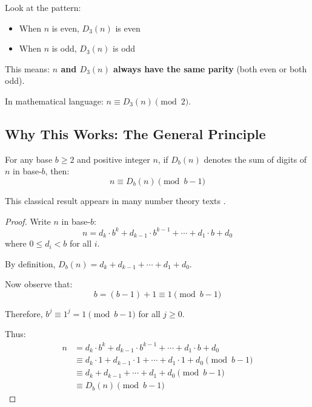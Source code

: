 \begin{intuitive}
Look at the pattern:
\begin{itemize}
\item When $n$ is even, $D_3(n)$ is even
\item When $n$ is odd, $D_3(n)$ is odd
\end{itemize}

This means: \textbf{$n$ and $D_3(n)$ always have the same parity} (both even or both odd).

In mathematical language: $n \equiv D_3(n) \pmod{2}$.
\end{intuitive}

\subsection{Why This Works: The General Principle}
\label{subsec:general-principle}


\begin{theorem}
\label{thm:digital-sum-modular}
For any base $b \geq 2$ and positive integer $n$, if $D_b(n)$ denotes the sum of digits of $n$ in base-$b$, then:
\begin{equation}
n \equiv D_b(n) \pmod{b-1}
\end{equation}
\end{theorem}

This classical result appears in many number theory texts \cite{hardy1979,apostol1976}.

\begin{proof}
Write $n$ in base-$b$:
\begin{equation}
n = d_k \cdot b^k + d_{k-1} \cdot b^{k-1} + \cdots + d_1 \cdot b + d_0
\end{equation}
where $0 \leq d_i < b$ for all $i$.

By definition, $D_b(n) = d_k + d_{k-1} + \cdots + d_1 + d_0$.

Now observe that:
\begin{equation}
b = (b-1) + 1 \equiv 1 \pmod{b-1}
\end{equation}

Therefore, $b^j \equiv 1^j = 1 \pmod{b-1}$ for all $j \geq 0$.

Thus:
\begin{align}
n &= d_k \cdot b^k + d_{k-1} \cdot b^{k-1} + \cdots + d_1 \cdot b + d_0 \\
&\equiv d_k \cdot 1 + d_{k-1} \cdot 1 + \cdots + d_1 \cdot 1 + d_0 \pmod{b-1} \\
&\equiv d_k + d_{k-1} + \cdots + d_1 + d_0 \pmod{b-1} \\
&\equiv D_b(n) \pmod{b-1}
\end{align}
\end{proof}

